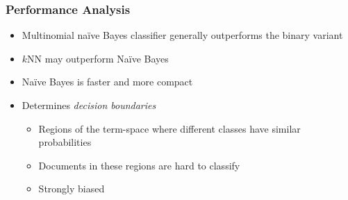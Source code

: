 \documentclass{beamer}
\begin{document}

  



\begin{frame} \frametitle{Performance Analysis}
  
  \begin{itemize}
  \item Multinomial na{\"i}ve Bayes classifier generally outperforms the binary
    variant
  \item $k$NN may outperform Na{\"i}ve Bayes
  \item Na{\"i}ve Bayes is faster and more compact
  \item Determines \emph{decision boundaries}
    \begin{itemize}
    \item Regions of the term-space where different classes have similar
      probabilities
    \item Documents in these regions are hard to classify
    \item Strongly biased
    \end{itemize}
  \end{itemize}

\end{frame}
\end{document}
